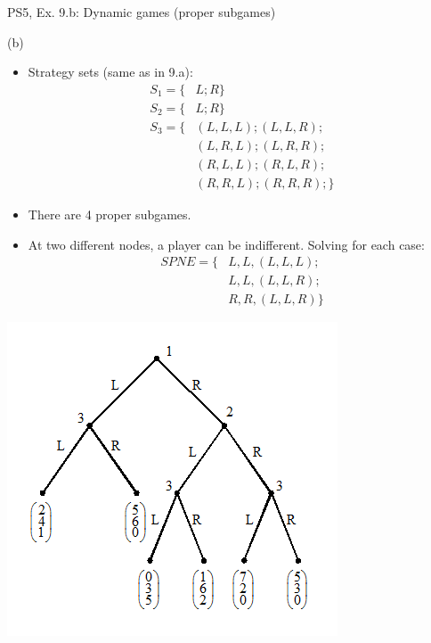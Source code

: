 \begin{frame}{PS5, Ex. 9.b: Dynamic games (proper subgames)}
  \begin{multicols}{2}
    (b)
    \begin{itemize}
      \item Strategy sets (same as in 9.a):
      \begin{align*}
        S_1=\{&L;R\}\\
        S_2=\{&L;R\}\\
        S_3=\{&(L,L,L);(L,L,R);\\
              &(L,R,L);(L,R,R);\\
              &(R,L,L);(R,L,R);\\
              &(R,R,L);(R,R,R);\}
      \end{align*}
      \item There are 4 proper subgames.
      \item At two different nodes, a player can be indifferent. Solving for each case:
      \begin{align*}
        SPNE=\{ &L,L,(L,L,L);\\
                &L,L,(L,L,R);\\
                &R,R,(L,L,R)\}
      \end{align*}
    \end{itemize}
    \vfill\null \columnbreak
    \includegraphics[width=1.2\columnwidth]{figures/Set_5_figure_2}
    \vfill\null
  \end{multicols}
\end{frame}



